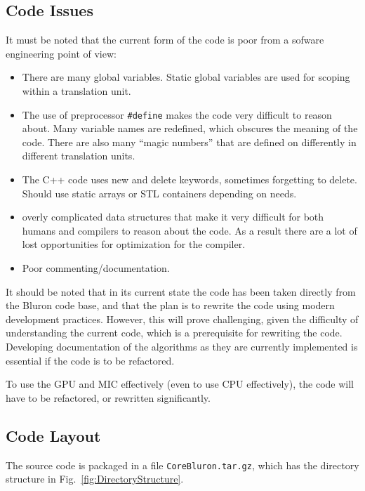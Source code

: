 \documentclass[11pt,a4paper]{article}
\newcommand{\lst}[1]{\lstinline!#1!} %
\newcommand{\fig}[1]{Fig.~\ref{#1}} %
\begin{document}
\subsection{Code Issues}
It must be noted that the current form of the code is poor from a sofware engineering point of view:
\begin{itemize}
    \item
        There are many global variables. Static global variables are used for scoping within a translation unit.
    \item
        The use of preprocessor \lst{#define} makes the code very difficult to reason about. Many variable names are redefined, which obscures the meaning of the code. There are also many ``magic numbers'' that are defined on differently in different translation units.
    \item
        The C++ code uses new and delete keywords, sometimes forgetting to delete. Should use static arrays or STL containers depending on needs.
    \item
        overly complicated data structures that make it very difficult for both humans and compilers to reason about the code. As a result there are a lot of lost opportunities for optimization for the compiler.
    \item
        Poor commenting/documentation.
\end{itemize}

It should be noted that in its current state the code has been taken directly from the Bluron code base, and that the plan is to rewrite the code using modern development practices. However, this will prove challenging, given the difficulty of understanding the current code, which is a prerequisite for rewriting the code. Developing documentation of the algorithms as they are currently implemented is essential if the code is to be refactored.

To use the GPU and MIC effectively (even to use CPU effectively), the code will have to be refactored, or rewritten significantly.
\subsection{Code Layout}
The source code is packaged in a file \lst{CoreBluron.tar.gz}, which has the directory structure in \fig{fig:DirectoryStructure}.
\end{document}

